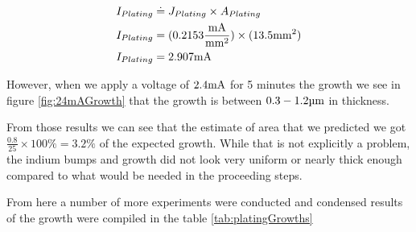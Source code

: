 \begin{equation}\notag
    \begin{split}
        I_{Plating} &\doteq J_{Plating} \times A_{Plating} \\
        I_{Plating} &= (0.2153 \junits) \times (13.5 \sqmm) \\
        I_{Plating} &= 2.907 \mA
    \end{split}
\end{equation}


However, when we apply a voltage of $2.4 \mA$ for 5 minutes the growth we see in figure \ref{fig:24mAGrowth} that the growth is between $0.3-1.2 \um$ in thickness.


From those results we can see that the estimate of area that we predicted we got $\frac{0.8}{25} \times 100\% = 3.2\%$ of the expected growth. While that is not explicitly a problem, the indium bumps and growth did not look very uniform or nearly thick enough compared to what would be needed in the proceeding steps.

From here a number of more experiments were conducted and condensed results of the growth were compiled in the table \ref{tab:platingGrowths}


